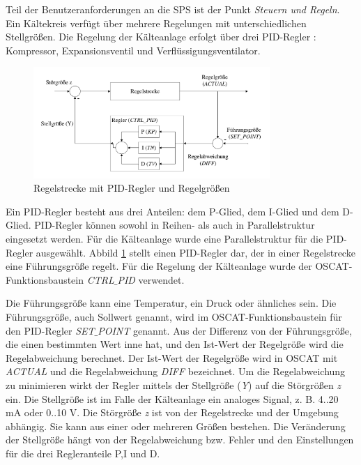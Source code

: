 Teil der Benutzeranforderungen an die SPS ist der Punkt \textit{Steuern und Regeln}. 
Ein Kältekreis verfügt über mehrere Regelungen mit unterschiedlichen Stellgrößen. Die Regelung der Kälteanlage erfolgt über drei PID-Regler : 	Kompressor,	Expansionsventil und Verflüssigungsventilator.

\begin{figure}[htb]
\centering		\includegraphics[page=1, width=0.80\textwidth]{Pictures/Versuchsaufbau/PID-Regler.pdf}
\caption{Regelstrecke mit PID-Regler und Regelgrößen}
\label{fig:PID_Regler}
\end{figure}

Ein PID-Regler besteht aus drei Anteilen: dem P-Glied, dem I-Glied und dem D-Glied. PID-Regler können sowohl in Reihen- als auch in Parallelstruktur eingesetzt werden. Für die Kälteanlage wurde eine Parallelstruktur für die PID-Regler ausgewählt. Abbild \ref{fig:PID_Regler} stellt einen  PID-Regler dar, der in einer Regelstrecke eine Führungsgröße regelt.
Für die Regelung der Kälteanlage wurde der OSCAT-Funktionsbaustein \textit{CTRL$\_$PID} verwendet. 

Die Führungsgröße kann eine Temperatur, ein Druck oder ähnliches sein. Die Führungsgröße, auch Sollwert genannt, wird im OSCAT-Funktionsbaustein für den PID-Regler \textit{SET$\_$POINT} genannt. Aus der Differenz von der Führungsgröße, die einen bestimmten Wert inne hat, und den Ist-Wert der Regelgröße wird die Regelabweichung berechnet. Der Ist-Wert der Regelgröße wird in OSCAT mit \textit{ACTUAL} und die Regelabweichung \textit{DIFF} bezeichnet. 
Um die Regelabweichung zu minimieren wirkt der Regler mittels der Stellgröße (\textit{Y}) auf die Störgrößen \textit{z} ein. Die Stellgröße ist im Falle der Kälteanlage ein analoges Signal, z. B. 4..20 mA oder 0..10 V. Die Störgröße \textit{z} ist von der Regelstrecke und der Umgebung abhängig. Sie kann aus einer oder mehreren Größen bestehen. Die Veränderung der Stellgröße hängt von der Regelabweichung bzw. Fehler und den Einstellungen für die drei Regleranteile P,I und D. \citep{OSCAT2016}

